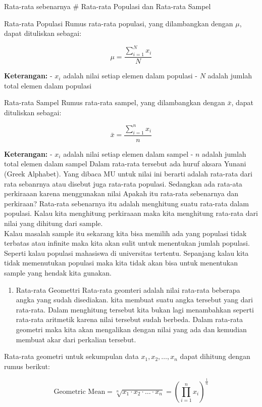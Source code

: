 \documentclass[
]{book}
\providecommand{\tightlist}{%
  \setlength{\itemsep}{0pt}\setlength{\parskip}{0pt}}
\theoremstyle{definition}
\theoremstyle{definition}
\theoremstyle{definition}
\theoremstyle{definition}
\theoremstyle{remark}
\begin{document}
Rata-rata sebenarnya
\# Rata-rata Populasi dan Rata-rata Sampel

Rata-rata Populasi
Rumus rata-rata populasi, yang dilambangkan dengan \(\mu\), dapat dituliskan sebagai:

\[
\mu = \frac{\sum_{i=1}^{N} x_i}{N}
\]

\textbf{Keterangan:}
- \(x_i\) adalah nilai setiap elemen dalam populasi
- \(N\) adalah jumlah total elemen dalam populasi

Rata-rata Sampel
Rumus rata-rata sampel, yang dilambangkan dengan \(\bar{x}\), dapat dituliskan sebagai:

\[
\bar{x} = \frac{\sum_{i=1}^{n} x_i}{n}
\]

\textbf{Keterangan:}
- \(x_i\) adalah nilai setiap elemen dalam sampel
- \(n\) adalah jumlah total elemen dalam sampel
Dalam rata-rata tersebut ada huruf aksara Yunani (Greek Alphabet). Yang dibaca MU untuk nilai ini berarti adalah rata-rata dari rata sebanrnya atau disebut juga rata-rata populasi. Sedangkan ada rata-ata perkiraaan karena menggunakan nilai
Apakah itu rata-rata sebenarnya dan perkiraan?
Rata-rata sebenarnya itu adalah menghitung suatu rata-rata dalam populasi. Kalau kita menghitung perkiraaan maka kita menghitung rata-rata dari nilai yang dihitung dari sample.\\
Kalau masalah sample itu sekarang kita bisa memilih ada yang populasi tidak terbatas atau infinite maka kita akan sulit untuk menentukan jumlah populasi. Seperti kalau populasi mahasiswa di universitas tertentu. Sepanjang kalau kita tidak memenutukan populasi maka kita tidak akan bisa untuk menentukan sample yang hendak kita gunakan.

\begin{enumerate}
\def\labelenumi{\arabic{enumi}.}
\setcounter{enumi}{1}
\tightlist
\item
  Rata-rata Geomettri
  Rata-rata geomteri adalah nilai rata-rata beberapa angka yang sudah disediakan. kita membuat suatu angka tersebut yang dari rata-rata. Dalam menghitung tersebut kita bukan lagi menambahkan seperti rata-rata aritmetik karena nilai tersebut sudah berbeda. Dalam rata-rata geometri maka kita akan mengalikan dengan nilai yang ada dan kemudian membuat akar dari perkalian tersebut.
\end{enumerate}

Rata-rata geometri untuk sekumpulan data \(x_1, x_2, \dots, x_n\) dapat dihitung dengan rumus berikut:

\[
\text{Geometric Mean} = \sqrt[n]{x_1 \cdot x_2 \cdot \dots \cdot x_n} = \left( \prod_{i=1}^{n} x_i \right)^{\frac{1}{n}}
\]
\end{document}
